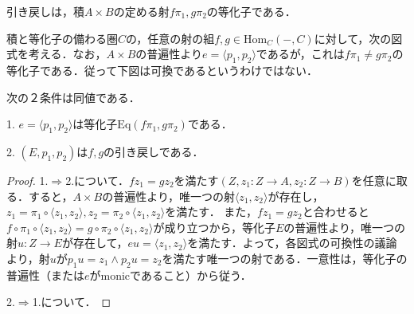 \documentclass[uplatex, 12pt, dvipdfmx]{jsarticle}
\begin{document}
引き戻しは，積$A\times B$の定める射$f\pi_1,g\pi_2$の等化子である．
\begin{proposition}[引き戻しの等化子としての特徴付け]
    積と等化子の備わる圏$C$の，任意の射の組$f,g\in\mathrm{Hom}_C(-,C)$に対して，次の図式を考える．なお，$A\times B$の普遍性より$e=\langle p_1,p_2\rangle$であるが，これは$f\pi_1\ne g\pi_2$の等化子である．従って下図は可換であるというわけではない．
    \begin{center}
    \end{center}
    次の２条件は同値である．

    1. $e=\langle p_1,p_2\rangle$は等化子$\mathrm{Eq}(f\pi_1,g\pi_2)$である．

    2. $(E,p_1,p_2)$は$f,g$の引き戻しである．
\end{proposition}
\begin{proof}
    1.$\Rightarrow$2.について．$fz_1=gz_2$を満たす$(Z,z_1:Z\to A,z_2:Z\to B)$を任意に取る．すると，$A\times B$の普遍性より，唯一つの射$\langle z_1,z_2\rangle$が存在し，$z_1=\pi_1\circ\langle z_1,z_2\rangle,z_2=\pi_2\circ\langle z_1,z_2\rangle$を満たす．
    また，$fz_1=gz_2$と合わせると$f\circ\pi_1\circ\langle z_1,z_2\rangle=g\circ\pi_2\circ\langle z_1,z_2\rangle$が成り立つから，等化子$E$の普遍性より，唯一つの射$u:Z\to E$が存在して，$eu=\langle z_1,z_2\rangle$を満たす．よって，各図式の可換性の議論より，射$u$が$p_1u=z_1\land p_2u=z_2$を満たす唯一つの射である．一意性は，等化子の普遍性（または$e$がmonicであること）から従う．
    \begin{center}
    \end{center}

    2.$\Rightarrow$1.について．
\end{proof}
\end{document}
